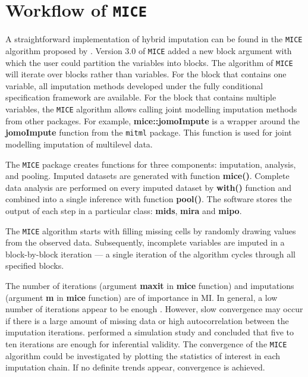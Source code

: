 \section{Workflow of \texttt{MICE}}
A straightforward implementation of hybrid imputation can be found in the \texttt{MICE} algorithm proposed by \citet{Buuren2011}. Version 3.0 of \texttt{MICE} added a new block argument with which the user could partition the variables into blocks. The algorithm of \texttt{MICE} will iterate over blocks rather than variables. For the block that contains one variable, all imputation methods developed under the fully conditional specification framework are available. For the block that contains multiple variables, the \texttt{MICE} algorithm allows calling joint modelling imputation methods from other packages. For example, \textbf{mice::jomoImpute} is a wrapper around the \textbf{jomoImpute} function from the \texttt{mitml} package. This function is used for joint modelling imputation of multilevel data. 

The \texttt{MICE} package creates functions for three components: imputation, analysis, and pooling.  Imputed datasets are generated with function \textbf{mice()}. Complete data analysis are performed on every imputed dataset by \textbf{with()} function and combined into a single inference with function \textbf{pool()}. The software stores the output of each step in a particular class: \textbf{mids}, \textbf{mira} and \textbf{mipo}. 

The \texttt{MICE} algorithm starts with filling missing cells by randomly drawing values from the observed data. Subsequently, incomplete variables are imputed in a block-by-block iteration — a single iteration of the algorithm cycles through all specified blocks.

The number of iterations (argument \textbf{maxit} in \textbf{mice} function) and imputations (argument \textbf{m} in \textbf{mice} function) are of importance in MI. In general, a low number of iterations appear to be enough \citep{brand1999development, van1999multiple}. However, slow convergence may occur if there is a large amount of missing data or high autocorrelation between the imputation iterations. \citet{oberman2020missing} performed a simulation study and concluded that five to ten iterations are enough for inferential validity. The convergence of the \texttt{MICE} algorithm could be investigated by plotting the statistics of interest in each imputation chain. If no definite trends appear, convergence is achieved.  

